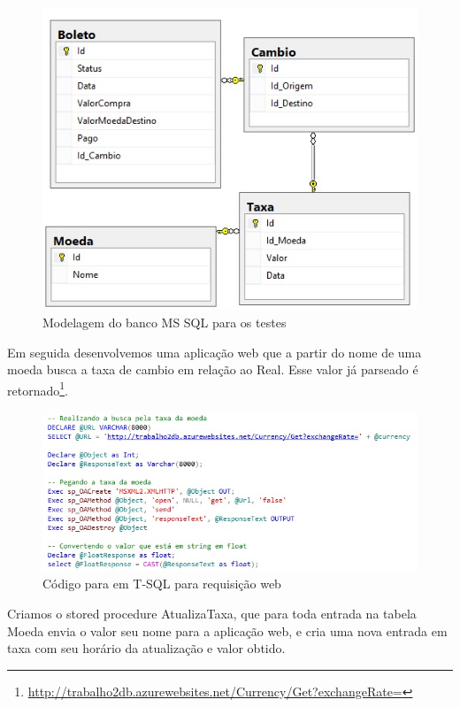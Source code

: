 \documentclass[conference]{IEEEtran}
\begin{document}
    \begin{figure}[!t]
      \centering
      \includegraphics[scale=0.65]{img/tabela.jpg}
      \caption{Modelagem do banco MS SQL para os testes}
    \end{figure}

  	Em seguida desenvolvemos uma aplicação web que a partir do nome de uma moeda busca a taxa de cambio em relação ao Real. Esse valor já parseado é retornado\footnote{\href{http://trabalho2db.azurewebsites.net/Currency/Get?exchangeRate=}{http://trabalho2db.azurewebsites.net/Currency/Get?exchangeRate=}}.

    \begin{figure}[!t]
      \centering
  	  \includegraphics[scale=0.65]{img/requisicao.jpg}
      \caption{Código para em T-SQL para requisição web}
    \end{figure}

  	Criamos o stored procedure AtualizaTaxa, que para toda entrada na tabela Moeda envia o valor seu nome para a aplicação web, e cria uma nova entrada em taxa com seu horário da atualização e valor obtido.
\end{document}
